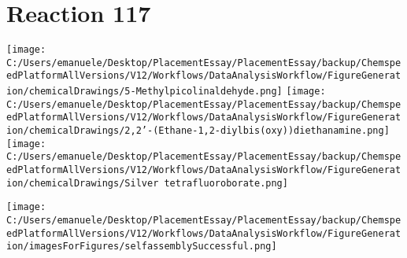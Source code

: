 \documentclass{article}%
\begin{document}
\section*{Reaction 117}%
%
\begin{scheme}[H]%
\begin{minipage}{0.5\textwidth}%
\texttt{[image: C:/Users/emanuele/Desktop/PlacementEssay/PlacementEssay/backup/ChemspeedPlatformAllVersions/V12/Workflows/DataAnalysisWorkflow/FigureGeneration/chemicalDrawings/5-Methylpicolinaldehyde.png]}%
\texttt{[image: C:/Users/emanuele/Desktop/PlacementEssay/PlacementEssay/backup/ChemspeedPlatformAllVersions/V12/Workflows/DataAnalysisWorkflow/FigureGeneration/chemicalDrawings/2,2'-(Ethane-1,2-diylbis(oxy))diethanamine.png]}%
\texttt{[image: C:/Users/emanuele/Desktop/PlacementEssay/PlacementEssay/backup/ChemspeedPlatformAllVersions/V12/Workflows/DataAnalysisWorkflow/FigureGeneration/chemicalDrawings/Silver tetrafluoroborate.png]}%
\end{minipage}%
\begin{minipage}{0.5\textwidth}%
\begin{center}%
\texttt{[image: C:/Users/emanuele/Desktop/PlacementEssay/PlacementEssay/backup/ChemspeedPlatformAllVersions/V12/Workflows/DataAnalysisWorkflow/FigureGeneration/imagesForFigures/selfassemblySuccessful.png]}%
\end{center}%
\end{minipage}%
\caption{Self-assembly of components 3, 19, with Silver(I) in a 3.0:1.5:1.0 molar ratio in CH$_3$CN at 60\textdegree C for 40h. These are the reagents (starting materials) for reaction 117.}%
\end{scheme}%
\end{document}
